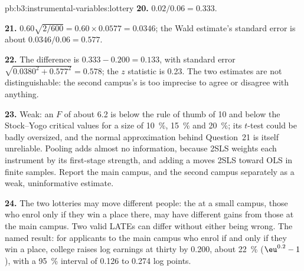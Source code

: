\begin{solution}{pb:b3:instrumental-variables:lottery}
\textbf{20.} $0.02/0.06 = 0.333$.

\textbf{21.} $0.60\sqrt{2/600} = 0.60 \times 0.0577 = 0.0346$; the Wald
estimate's standard error is about $0.0346/0.06 = 0.577$.

\textbf{22.} The difference is $0.333 - 0.200 = 0.133$, with standard error
$\sqrt{0.0380^2 + 0.577^2} = 0.578$; the $z$ statistic is 0.23. The two
estimates are not distinguishable: the second campus's is too imprecise to
agree or disagree with anything.

\textbf{23.} Weak: an $F$ of about 6.2 is below the rule of thumb of 10 and
below the Stock--Yogo critical values for a size of 10~\%, 15~\% and 20~\%;
its $t$-test could be badly oversized, and the normal approximation behind
Question~21 is itself unreliable. Pooling adds almost no information, because
2SLS weights each instrument by its first-stage strength, and adding a  moves 2SLS toward OLS in finite samples. Report the main campus,
and the second campus separately as a weak, uninformative estimate.

\textbf{24.} The two lotteries may move different people: the  at a
small campus, those who enrol only if they win a place there, may have
different gains from those at the main campus. Two valid LATEs can differ
without either being wrong. The named result: for applicants to the main
campus who enrol if and only if they win a place, college raises log earnings
at thirty by 0.200, about 22~\% ($\eu^{0.2} - 1$), with a 95~\% interval of
0.126 to 0.274 log points.
\end{solution}
